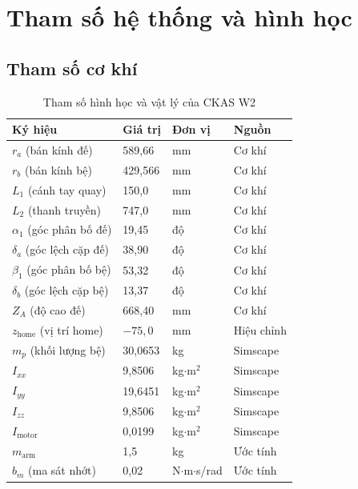 \documentclass[12pt,a4paper]{article}
\begin{document}
\section{Tham số hệ thống và hình học}

\subsection{Tham số cơ khí}

\begin{table}[H]\centering
\caption{Tham số hình học và vật lý của CKAS W2}
\label{tab:params}
\begin{tabular}{@{}llll@{}}
\toprule
\bfseries Ký hiệu & \bfseries Giá trị & \bfseries Đơn vị & \bfseries Nguồn \\
\midrule
$r_a$ (bán kính đế) & 589{,}66 & mm & Cơ khí \\
$r_b$ (bán kính bệ) & 429{,}566 & mm & Cơ khí \\
$L_1$ (cánh tay quay) & 150{,}0 & mm & Cơ khí \\
$L_2$ (thanh truyền)  & 747{,}0 & mm & Cơ khí \\
$\alpha_1$ (góc phân bố đế) & 19{,}45 & độ & Cơ khí \\
$\delta_a$ (góc lệch cặp đế) & 38{,}90 & độ & Cơ khí \\
$\beta_1$ (góc phân bố bệ)  & 53{,}32 & độ & Cơ khí \\
$\delta_b$ (góc lệch cặp bệ) & 13{,}37 & độ & Cơ khí \\
$Z_A$ (độ cao đế) & 668{,}40 & mm & Cơ khí \\
$z_{\text{home}}$ (vị trí home) & $-75{,}0$ & mm & Hiệu chỉnh \\
\midrule
$m_p$ (khối lượng bệ) & 30{,}0653 & kg & Simscape \\
$I_{xx}$ & 9{,}8506 & kg$\cdot$m$^2$ & Simscape \\
$I_{yy}$ & 19{,}6451 & kg$\cdot$m$^2$ & Simscape \\
$I_{zz}$ & 9{,}8506 & kg$\cdot$m$^2$ & Simscape \\
$I_{\text{motor}}$ & 0{,}0199 & kg$\cdot$m$^2$ & Simscape \\
$m_{\text{arm}}$ & 1{,}5 & kg & Ước tính \\
$b_m$ (ma sát nhớt) & 0{,}02 & N$\cdot$m$\cdot$s/rad & Ước tính \\
\bottomrule
\end{tabular}
\end{table}
\end{document}
